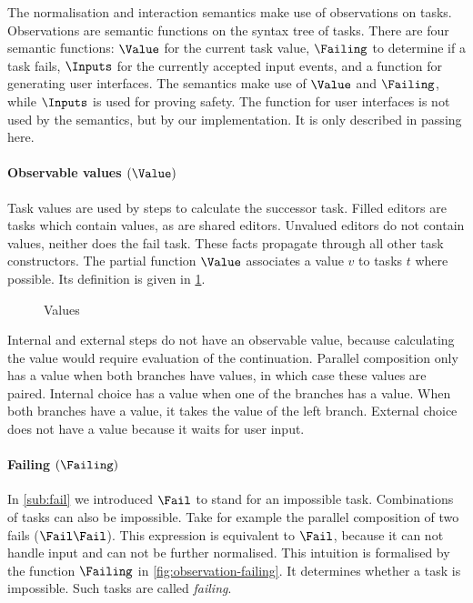 The normalisation and interaction semantics make use of observations on tasks.
Observations are semantic functions on the syntax tree of tasks.
There are four semantic functions: $\Value$ for the current task value, $\Failing$ to determine if a task fails, $\Inputs$ for the currently accepted input events, and a function for generating user interfaces.
The semantics make use of $\Value$ and $\Failing$, while $\Inputs$ is used for proving safety.
The function for user interfaces is not used by the semantics, but by our implementation.
It is only described in passing here.



\paragraph{Observable values $(\Value)$}

Task values are used by steps to calculate the successor task.
Filled editors are tasks which contain values, as are shared editors.
Unvalued editors do not contain values, neither does the fail task.
These facts propagate through all other task constructors.
The partial function $\Value$ associates a value $v$ to tasks $t$ where possible.
Its definition is given in \cref{fig:observation-value}.

\begin{figure}[h]
  \small
  \caption{Values} \label{fig:observation-value}
\end{figure}

Internal and external steps do not have an observable value, because calculating the value would require evaluation of the continuation.
Parallel composition only has a value when both branches have values, in which case these values are paired.
Internal choice has a value when one of the branches has a value.
When both branches have a value, it takes the value of the left branch.
External choice does not have a value because it waits for user input.



\paragraph{Failing $(\Failing)$}

In \cref{sub:fail} we introduced $\Fail$ to stand for an impossible task.
Combinations of tasks can also be impossible.
Take for example the parallel composition of two fails ($\Fail \And \Fail$).
This expression is equivalent to $\Fail$, because it can not handle input and can not be further normalised.
%
This intuition is formalised by the function $\Failing$ in \cref{fig:observation-failing}.
It determines whether a task is impossible.
Such tasks are called \emph{failing}.

